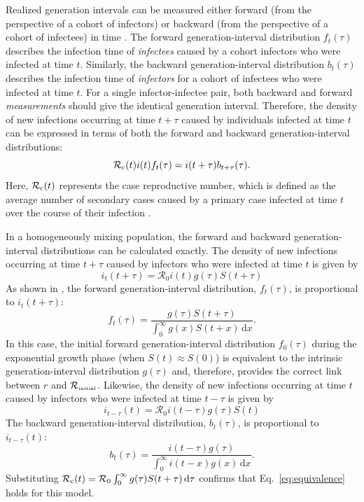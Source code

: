 \documentclass[12pt]{article}
\newcommand{\eref}[1]{Eq.~\ref{eq:#1}}
\newcommand{\Rx}[1]{\ensuremath{{\mathcal R}_{#1}}\xspace}
\newcommand{\RR}{\ensuremath{{\mathcal R}}}
\newcommand{\Rini}{\Rx{\textrm{\tiny initial}}}
\begin{document}
Realized generation intervals can be measured either forward (from the perspective of a cohort of infectors) or backward (from the perspective of a cohort of infectees) in time \citep{champredon2015intrinsic, britton2019estimation}.
The forward generation-interval distribution $f_t(\tau)$ describes the infection time of \emph{infectees} caused by a cohort infectors who were infected at time $t$.
Similarly, the backward generation-interval distribution $b_t(\tau)$ describes the infection time of \emph{infectors} for a cohort of infectees who were infected at time $t$.
For a single infector-infectee pair, both backward and forward \emph{measurements} should give the identical generation interval.
Therefore, the density of new infections occurring at time $t + \tau$ caused by individuals infected at time $t$ can be expressed in terms of both the forward and backward generation-interval distributions:
\begin{equation}
\mathcal R_{\rm c}(t) i(t) f_t(\tau) = i(t+\tau) b_{t+\tau}(\tau).
\label{eq:equivalence}
\end{equation}
Here, $\mathcal R_{\rm c}(t)$ represents the case reproductive number, which is defined as the average number of secondary cases caused by a primary case infected at time $t$ over the course of their infection \citep{fraser2007estimating}.

In a homogeneously mixing population, the forward and backward generation-interval distributions can be calculated exactly.
The density of new infections occurring at time $t+\tau$ caused by infectors who were infected at time $t$ is given by
\begin{equation}
i_{t}(t+\tau) = \RR_0 i(t) g(\tau) S(t+\tau)
\end{equation}
As shown in \cite{champredon2015intrinsic}, the forward generation-interval distribution, $f_t(\tau)$, is proportional to $i_{t}(t+\tau)$:
\begin{equation}
f_t(\tau) = \frac{g(\tau) S(t+\tau)}{\int_0^\infty g(x) S(t+x) \,\mathrm{d}x}.
\label{eq:forward}
\end{equation}
In this case, the initial forward generation-interval distribution $f_0(\tau)$ during the exponential growth phase (when $S(t) \approx S(0)$) is equivalent to the intrinsic generation-interval distribution $g(\tau)$ and, therefore, provides the correct link between $r$ and \Rini.
Likewise, the density of new infections occurring at time $t$ caused by infectors who were infected at time $t-\tau$ is given by
\begin{equation}
i_{t-\tau}(t) = \RR_0 i(t-\tau) g(\tau) S(t)
\end{equation}
The backward generation-interval distribution, $b_t(\tau)$, is proportional to $i_{t-\tau}(t)$:
\begin{equation}
b_t(\tau) = \frac{i(t-\tau) g(\tau)}{\int_0^\infty i(t-x) g(x)\,\mathrm{d}x}.
\end{equation}
Substituting $\mathcal R_{\rm c}(t) = \mathcal R_0 \int_0^\infty g(\tau) S(t+\tau) \,\mathrm{d}\tau$ confirms that \eref{equivalence} holds for this model.
\end{document}
